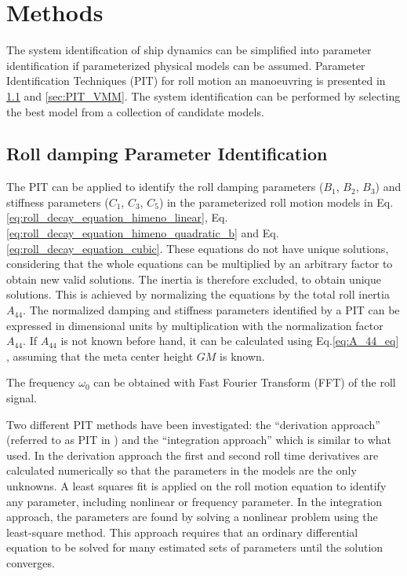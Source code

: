 \chapter{Methods\label{ch:methods}}
The system identification of ship dynamics can be simplified into parameter identification if parameterized physical models can be assumed. Parameter Identification Techniques (PIT) for roll motion an manoeuvring is presented in \ref{sec:PIT_roll} and \ref{sec:PIT_VMM}. The system identification can be performed by selecting the best model from a collection of candidate models.

\section{Roll damping Parameter Identification} \label{sec:PIT_roll}
\noindent The PIT can be applied to identify the roll damping parameters ($B_1$, $B_2$, $B_3$) and stiffness parameters ($C_1$, $C_3$, $C_5$) in the parameterized roll motion models in Eq.\ref{eq:roll_decay_equation_himeno_linear}, Eq.\ref{eq:roll_decay_equation_himeno_quadratic_b} and Eq.\ref{eq:roll_decay_equation_cubic}. These equations do not have unique solutions, considering that the whole equations can be multiplied by an arbitrary factor to obtain new valid solutions. The inertia is therefore excluded, to obtain unique solutions. This is achieved by normalizing the equations by the total roll inertia $A_{44}$.
The normalized damping and stiffness parameters identified by a PIT can be expressed in dimensional units by multiplication with the normalization factor $A_{44}$. If $A_{44}$ is not known before hand, it can be calculated using Eq.\ref{eq:A_44_eq} \cite{piehl_ship_2016}, assuming that the meta center height $GM$ is known.

\noindent The frequency $\omega_0$ can be obtained with Fast Fourier Transform (FFT) of the roll signal. 

Two different PIT methods have been investigated: the ``derivation approach'' (referred to as PIT in \parencite{imo_1200_2006}) and the ``integration approach'' which is similar to what \parencite{soder_assessment_2019} used. In the derivation approach the first and second roll time derivatives are calculated numerically so that the parameters in the models are the only unknowns. A least squares fit is applied on the roll motion equation to identify any parameter, including nonlinear or frequency parameter. In the integration approach, the parameters are found by solving a nonlinear problem using the least-square method. This approach requires that an ordinary differential equation to be solved for many estimated sets of parameters until the solution converges.

